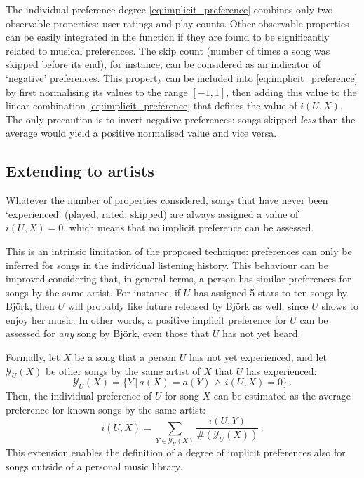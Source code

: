 The individual preference degree \eqref{eq:implicit_preference} combines only two observable properties: user ratings and play counts.
Other observable properties can be easily integrated in the function if they are found to be significantly related to musical preferences.
%
The skip count (number of times a song was skipped before its end), for instance, can be considered as an indicator of `negative' preferences.
This property can be included into \eqref{eq:implicit_preference} by first normalising its values to the range $[-1,1]$, then adding this value to the linear combination \eqref{eq:implicit_preference} that defines the value of $i(U,X)$.
The only precaution is to invert negative preferences: songs skipped \emph{less} than the average would yield a positive normalised value and vice versa.

\subsection{Extending to artists} %
\label{sub:expanding_to_artists2}

Whatever the number of properties considered, songs that have never been `experienced' (played, rated, skipped) are always assigned a value of $i(U,X) = 0$, which means that no implicit preference can be assessed.

This is an intrinsic limitation of the proposed technique: preferences can only be inferred for songs in the individual listening history.
This behaviour can be improved considering that, in general terms, a person has similar preferences for songs by the same artist.
For instance, if $U$ has assigned 5 stars to ten songs by Bj\"{o}rk, then $U$ will probably like future released by Bj\"{o}rk as well, since $U$ shows to enjoy her music. 
In other words, a positive implicit preference for $U$ can be assessed for \emph{any} song by Bj\"{o}rk, even those that $U$ has not yet heard.

Formally, let $X$ be a song that a person $U$ has not yet experienced, and let $\mathcal{Y}_U(X)$ be other songs by the same artist of $X$ that $U$ has experienced:
\begin{equation}
   \mathcal{Y}_U(X) = \{Y\,|\,a(X) = a(Y)\,\wedge\,i(U,X) = 0\}\,.
\end{equation}
Then, the individual preference of $U$ for song $X$ can be estimated as the average preference for known songs by the same artist:
%
\begin{equation*}
        i(U,X) = \sum_{Y \in \mathcal{Y}_U(X)} \frac{i(U,Y)}{\#(\mathcal{Y}_U(X))}\,.
\end{equation*}
%
This extension enables the definition of a degree of implicit preferences also for songs outside of a personal music library.


